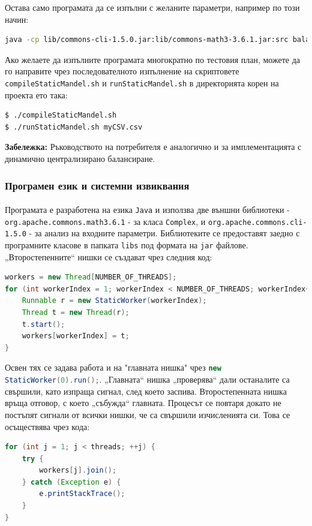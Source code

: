 \documentclass[a4paper,11pt]{article}
\begin{document}
Остава само програмата да се изпълни с желаните параметри, например по този начин:
\begin{lstlisting}[language=bash,caption={Изпълнение на програмата \lstinline{StaticMandelTest} с допълнително задаване на паралелизъм $p=4$}, breaklines=true, captionpos=b]
java -cp lib/commons-cli-1.5.0.jar:lib/commons-math3-3.6.1.jar:src balancing.constant.StaticMandelTest -p 4
\end{lstlisting}

Ако желаете да изпълните програмата многократно по тестовия план, можете да го направите чрез последователното изпълнение на скриптовете \lstinline{compileStaticMandel.sh} и \lstinline{runStaticMandel.sh} в директорията корен на проекта ето така:
\begin{lstlisting}[language=bash,caption={Компилиране и изпъление на програмата според тестовия план}, captionpos=b]
$ ./compileStaticMandel.sh
$ ./runStaticMandel.sh myCSV.csv
\end{lstlisting}
\textbf{Забележка: }Ръководството на потребителя е аналогично и за имплементацията с динамично централизирано балансиране. 
\subsubsection{Програмен език и системни извиквания}
\paragraph{}
Програмата е разработена на езика \lstinline{Java} и използва две външни библиотеки - \\ \lstinline{org.apache.commons.math3.6.1} - за класа \lstinline{Complex}, и \lstinline{org.apache.commons.cli-1.5.0} - за анализ на входните параметри. Библиотеките се предоставят заедно с програмните класове в папката \lstinline{libs} под формата на \lstinline{jar} файлове. \\
„Второстепенните“ нишки се създават чрез следния код:
\begin{lstlisting}[language=Java, caption={Инициализиране на $p-1$ нишки в Java}, captionpos=b]
workers = new Thread[NUMBER_OF_THREADS];
for (int workerIndex = 1; workerIndex < NUMBER_OF_THREADS; workerIndex++) {
    Runnable r = new StaticWorker(workerIndex);
    Thread t = new Thread(r);
    t.start();
    workers[workerIndex] = t;
}
\end{lstlisting}
Освен тях се задава работа и на "главната нишка" чрез \lstinline[language=Java]{new StaticWorker(0).run();}.
„Главната“ нишка „проверява“ дали останалите са свършили, като изпраща сигнал, след което заспива. Второстепенната нишка връща отговор, с което „събужда“ главната. Процесът се повтаря докато не постъпят сигнали от всички нишки, че са свършили изчисленията си. Това се осъществява чрез кода:
\begin{lstlisting}[language=Java, caption={Проверка на $p-1$ нишки в Java}, captionpos=b]
for (int j = 1; j < threads; ++j) {
    try {
        workers[j].join();
    } catch (Exception e) {
        e.printStackTrace();
    }
}
\end{lstlisting}
\end{document}
